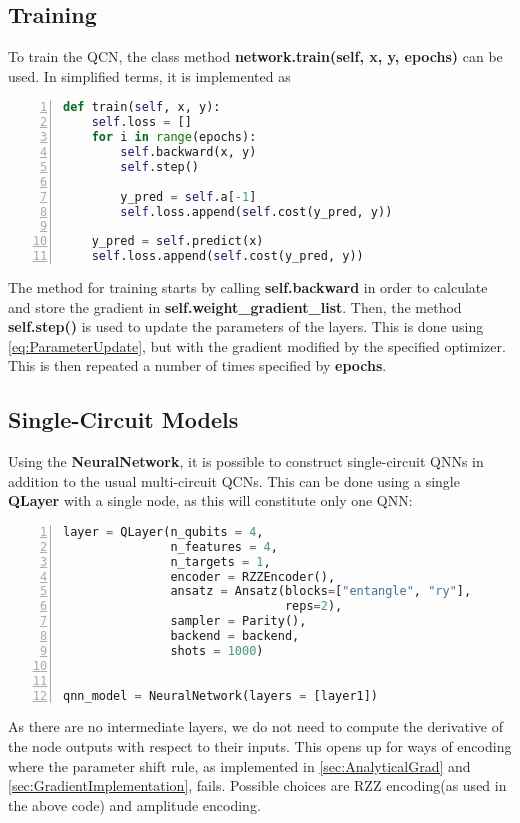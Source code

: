 \subsection{Training}\label{sec:QCNTraining}
To train the QCN, the class method \textbf{network.train(self, x, y, epochs)} can be used. In simplified terms, it is implemented as

\begin{lstlisting}[language=python, numbers=left]
def train(self, x, y):
    self.loss = []
    for i in range(epochs):
        self.backward(x, y)
        self.step()

        y_pred = self.a[-1]
        self.loss.append(self.cost(y_pred, y))
            
    y_pred = self.predict(x)
    self.loss.append(self.cost(y_pred, y))
\end{lstlisting}
The method for training starts by calling \textbf{self.backward} in order to calculate and store the gradient in \textbf{self.weight\_gradient\_list}. Then, the method \textbf{self.step()} is used to update the parameters of the layers. This is done using \cref{eq:ParameterUpdate}, but with the gradient modified by the specified optimizer. This is then repeated a number of times specified by \textbf{epochs}.

\subsection{Single-Circuit Models}\label{sec:Single-CircuitModel}
Using the \textbf{NeuralNetwork}, it is possible to construct single-circuit QNNs in addition to the usual multi-circuit QCNs. This can be done using a single \textbf{QLayer} with a single node, as this will constitute only one QNN:
\begin{lstlisting}[language=python, numbers=left]
layer = QLayer(n_qubits = 4,
               n_features = 4,
               n_targets = 1,
               encoder = RZZEncoder(),
               ansatz = Ansatz(blocks=["entangle", "ry"],
                               reps=2),
               sampler = Parity(),
               backend = backend,
               shots = 1000)
                               

qnn_model = NeuralNetwork(layers = [layer1])
\end{lstlisting}
As there are no intermediate layers, we do not need to compute the derivative of the node outputs with respect to their inputs. This opens up for ways of encoding where the parameter shift rule, as implemented in \cref{sec:AnalyticalGrad} and \cref{sec:GradientImplementation}, fails. Possible choices are RZZ encoding(as used in the above code) and amplitude encoding.

